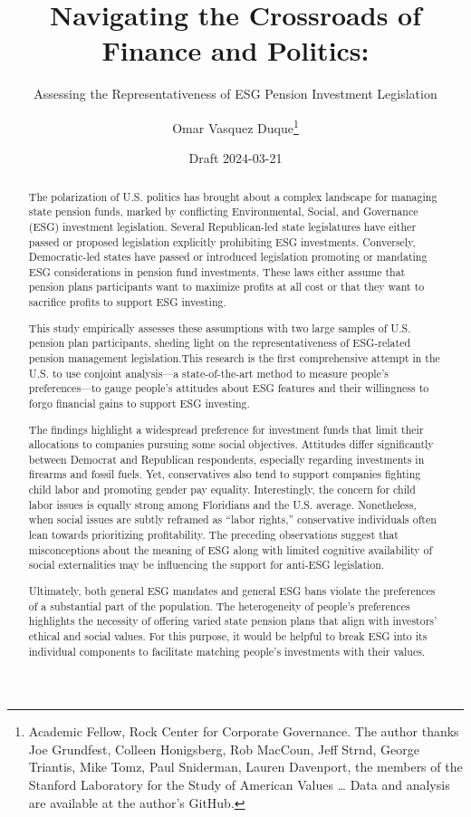 \documentclass[
  12pt,
]{article}
\title{Navigating the Crossroads of Finance and Politics:}
\subtitle{Assessing the Representativeness of ESG Pension Investment Legislation}
\author{Omar Vasquez Duque\footnote{Academic Fellow, Rock Center for Corporate Governance. The author thanks Joe Grundfest, Colleen Honigsberg, Rob MacCoun, Jeff Strnd, George Triantis, Mike Tomz, Paul Sniderman, Lauren Davenport, the members of the Stanford Laboratory for the Study of American Values \ldots{} Data and analysis are available at the author's GitHub.}}
\date{Draft 2024-03-21}
\begin{document}
\maketitle
\begin{abstract}
\fontsize{10pt}{11.5pt}\selectfont

The polarization of U.S. politics has brought about a complex landscape for managing state pension funds, marked by conflicting Environmental, Social, and Governance (ESG) investment legislation. Several Republican-led state legislatures have either passed or proposed legislation explicitly prohibiting ESG investments. Conversely, Democratic-led states have passed or introduced legislation promoting or mandating ESG considerations in pension fund investments. These laws either assume that pension plans participants want to maximize profits at all cost or that they want to sacrifice profits to support ESG investing.

This study empirically assesses these assumptions with two large samples of U.S. pension plan participants, sheding light on the representativeness of ESG-related pension management legislation.This research is the first comprehensive attempt in the U.S. to use conjoint analysis---a state-of-the-art method to measure people's preferences---to gauge people's attitudes about ESG features and their willingness to forgo financial gains to support ESG investing.

The findings highlight a widespread preference for investment funds that limit their allocations to companies pursuing some social objectives. Attitudes differ significantly between Democrat and Republican respondents, especially regarding investments in firearms and fossil fuels. Yet, conservatives also tend to support companies fighting child labor and promoting gender pay equality. Interestingly, the concern for child labor issues is equally strong among Floridians and the U.S. average. Nonetheless, when social issues are subtly reframed as ``labor rights,'' conservative individuals often lean towards prioritizing profitability. The preceding observations suggest that misconceptions about the meaning of ESG along with limited cognitive availability of social externalities may be influencing the support for anti-ESG legislation.

Ultimately, both general ESG mandates and general ESG bans violate the preferences of a substantial part of the population. The heterogeneity of people's preferences highlights the necessity of offering varied state pension plans that align with investors' ethical and social values. For this purpose, it would be helpful to break ESG into its individual components to facilitate matching people's investments with their values.
\end{abstract}
\end{document}
